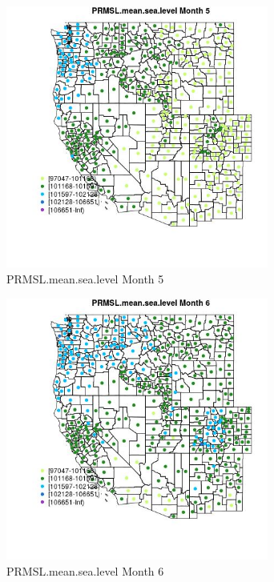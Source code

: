 \begin{figure} 
\centering  
\includegraphics[width=0.77\textwidth]{Code_Outputs/df_report_ML_predictors_CountyCentroid_Locations_Dates_2008-01-01to2018-12-31_MapObsMo5PRMSLmeansealevel.jpg} 
\caption{\label{fig:df_report_ML_predictors_CountyCentroid_Locations_Dates_2008-01-01to2018-12-31MapObsMo5PRMSLmeansealevel}PRMSL.mean.sea.level Month 5} 
\end{figure} 
 

\begin{figure} 
\centering  
\includegraphics[width=0.77\textwidth]{Code_Outputs/df_report_ML_predictors_CountyCentroid_Locations_Dates_2008-01-01to2018-12-31_MapObsMo6PRMSLmeansealevel.jpg} 
\caption{\label{fig:df_report_ML_predictors_CountyCentroid_Locations_Dates_2008-01-01to2018-12-31MapObsMo6PRMSLmeansealevel}PRMSL.mean.sea.level Month 6} 
\end{figure} 
 

